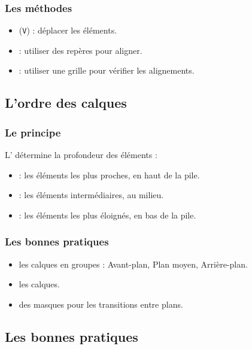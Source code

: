 \subsubsection{Les méthodes}

\begin{itemize}
    \item {} (\texttt{V}) : déplacer les éléments.
    \item {} : utiliser des repères pour aligner.
    \item {} : utiliser une grille pour vérifier les alignements.
\end{itemize}

\subsection{L'ordre des calques}

\subsubsection{Le principe}

L' détermine la profondeur des éléments :

\begin{itemize}
    \item {} : les éléments les plus proches, en haut de la pile.
    \item {} : les éléments intermédiaires, au milieu.
    \item {} : les éléments les plus éloignés, en bas de la pile.
\end{itemize}

\subsubsection{Les bonnes pratiques}

\begin{itemize}
    \item {} les calques en groupes : Avant-plan, Plan moyen, Arrière-plan.
    \item {} les calques.
    \item {} des masques pour les transitions entre plans.
\end{itemize}

\subsection{Les bonnes pratiques}

